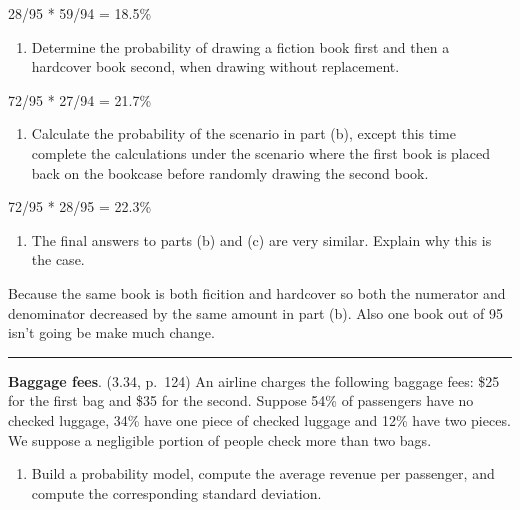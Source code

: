 \documentclass[]{article}
\providecommand{\tightlist}{%
  \setlength{\itemsep}{0pt}\setlength{\parskip}{0pt}}
\begin{document}
28/95 * 59/94 = 18.5\%

\begin{enumerate}
\def\labelenumi{(\alph{enumi})}
\setcounter{enumi}{1}
\tightlist
\item
  Determine the probability of drawing a fiction book first and then a
  hardcover book second, when drawing without replacement.
\end{enumerate}

72/95 * 27/94 = 21.7\%

\begin{enumerate}
\def\labelenumi{(\alph{enumi})}
\setcounter{enumi}{2}
\tightlist
\item
  Calculate the probability of the scenario in part (b), except this
  time complete the calculations under the scenario where the first book
  is placed back on the bookcase before randomly drawing the second
  book.
\end{enumerate}

72/95 * 28/95 = 22.3\%

\begin{enumerate}
\def\labelenumi{(\alph{enumi})}
\setcounter{enumi}{3}
\tightlist
\item
  The final answers to parts (b) and (c) are very similar. Explain why
  this is the case.
\end{enumerate}

Because the same book is both ficition and hardcover so both the
numerator and denominator decreased by the same amount in part (b). Also
one book out of 95 isn't going be make much change.

\begin{center}\rule{0.5\linewidth}{0.5pt}\end{center}

\clearpage

\textbf{Baggage fees}. (3.34, p.~124) An airline charges the following
baggage fees: \$25 for the first bag and \$35 for the second. Suppose
54\% of passengers have no checked luggage, 34\% have one piece of
checked luggage and 12\% have two pieces. We suppose a negligible
portion of people check more than two bags.

\begin{enumerate}
\def\labelenumi{(\alph{enumi})}
\tightlist
\item
  Build a probability model, compute the average revenue per passenger,
  and compute the corresponding standard deviation.
\end{enumerate}
\end{document}
